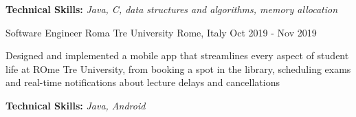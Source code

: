 \begin{cventries}
{\begin{cvitems}
        \item {\textbf{Technical Skills:} \textit{Java, C, data structures and algorithms, memory allocation}}
      \end{cvitems}
    }
  \cventry
    {Software Engineer} %
    {Roma Tre University} %
    {Rome, Italy} %
    {Oct 2019 - Nov 2019} %
    {
      \begin{cvitems} %
        \item {Designed and implemented a mobile app that streamlines every aspect of student life at ROme Tre University, from booking a spot in the library, scheduling exams and real-time notifications about lecture delays and cancellations}
        \item {\textbf{Technical Skills:} \textit{Java, Android}}
      \end{cvitems}
    }

\end{cventries}
